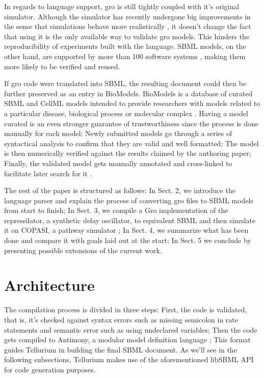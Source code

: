 \documentclass[12pt]{article}
\begin{document}
    In regards to language support, gro is still tightly coupled with it's original simulator. Although the simulator has recently undergone big improvements in the sense that simulations behave more realistically \cite{Gutirrez2017}, it doesn't change the fact that using it is the only available way to validate gro models. This hinders the reproducibility of experiments built with the language. SBML models, on the other hand, are supported by more than 100 software systems \cite{Hucka2007}, making them more likely to be verified and reused.
    
    If gro code were translated into SBML, the resulting document could then be further preserved as an entry in BioModels. BioModels is a database of curated SBML and CellML models intended to provide researchers with models related to a particular disease, biological process or molecular complex \cite{LeNovere2006}. Having a model curated is an even stronger guarantee of trustworthiness since the process is done manually for each model: Newly submitted models go through a series of syntactical analysis to confirm that they are valid and well formatted; The model is then numerically verified against the results claimed by the authoring paper; Finally, the validated model gets manually annotated and cross-linked to facilitate later search for it \cite{LeNovere2006}.
    
    The rest of the paper is structured as follows: In Sect. 2, we introduce the language parser and explain the process of converting gro files to SBML models from start to finish; In Sect. 3, we compile a Gro implementation of the repressilator, a synthetic delay oscillator, to equivalent SBML and then simulate it on COPASI, a pathway simulator \cite{Hoops2006}; In Sect. 4, we summarize what has been done and compare it with goals laid out at the start; In Sect. 5 we conclude by presenting possible extensions of the current work.
    

\section{Architecture}

    
    The compilation process is divided in three steps: First, the code is validated, that is, it's checked against syntax errors such as missing semicolon in rate statements and semantic error such as using undeclared variables; Then the code gets compiled to Antimony, a modular model definition language \cite{Smith2009}; This format guides Tellurium in building the final SBML document. As we'll see in the following subsections, Tellurium makes use of the aforementioned libSBML API for code generation purposes.
\end{document}
